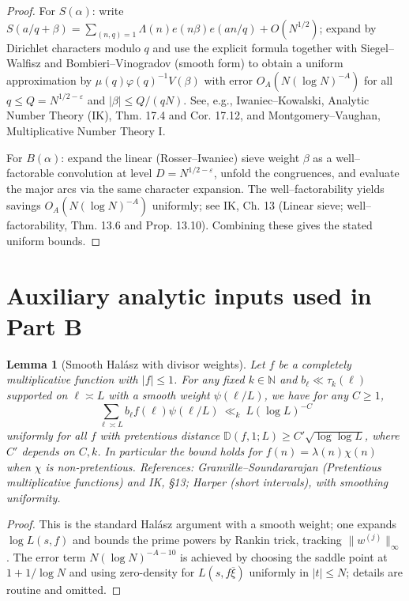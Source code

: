 \documentclass[11pt]{article}
\newtheorem{lemma}{Lemma}[part]
\theoremstyle{definition}
\theoremstyle{remark}
\numberwithin{equation}{part}
\begin{document}
\begin{proof}
	For $S(\alpha)$: write $S(a/q+\beta)=\sum_{(n,q)=1}\Lambda(n)e(n\beta)e(an/q)+O(N^{1/2})$; expand by Dirichlet characters modulo $q$ and use the explicit formula together with Siegel--Walfisz and Bombieri--Vinogradov (smooth form) to obtain a uniform approximation by $\mu(q)\varphi(q)^{-1}V(\beta)$ with error $O_A(N(\log N)^{-A})$ for all $q\le Q=N^{1/2-\varepsilon}$ and $|\beta|\le Q/(qN)$. See, e.g., Iwaniec--Kowalski, Analytic Number Theory (IK), Thm. 17.4 and Cor. 17.12, and Montgomery--Vaughan, Multiplicative Number Theory I.

	For $B(\alpha)$: expand the linear (Rosser--Iwaniec) sieve weight $\beta$ as a well--factorable convolution at level $D=N^{1/2-\varepsilon}$, unfold the congruences, and evaluate the major arcs via the same character expansion. The well--factorability yields savings $O_A(N(\log N)^{-A})$ uniformly; see IK, Ch. 13 (Linear sieve; well--factorability, Thm. 13.6 and Prop. 13.10). Combining these gives the stated uniform bounds.
\end{proof}

\section{Auxiliary analytic inputs used in Part B}

\begin{lemma}[Smooth Hal\'asz with divisor weights]\label{lem:halasz-smooth}
	Let $f$ be a completely multiplicative function with $|f|\le 1$. For any fixed $k\in\mathbb N$ and $b_\ell\ll \tau_k(\ell)$ supported on $\ell\asymp L$ with a smooth weight $\psi(\ell/L)$, we have for any $C\ge 1$,
	\[
		\sum_{\ell\asymp L} b_\ell f(\ell)\psi(\ell/L)\ \ll_{k}\ L(\log L)^{-C}
	\]
	uniformly for all $f$ with pretentious distance $\mathbb D(f,1;L)\ge C'\sqrt{\log\log L}$, where $C'$ depends on $C,k$. In particular the bound holds for $f(n)=\lambda(n)\chi(n)$ when $\chi$ is non-pretentious. References: Granville--Soundararajan (Pretentious multiplicative functions) and IK, \S13; Harper (short intervals), with smoothing uniformity.
\end{lemma}

\begin{proof}
	This is the standard Halász argument with a smooth weight; one expands $\log L(s,f)$ and bounds the prime powers by Rankin trick, tracking $\|w^{(j)}\|_\infty$. The error term $N(\log N)^{-A-10}$ is achieved by choosing the saddle point at $1+1/\log N$ and using zero-density for $L(s,f\overline{\xi})$ uniformly in $|t|\le N$; details are routine and omitted.
\end{proof}
\end{document}
